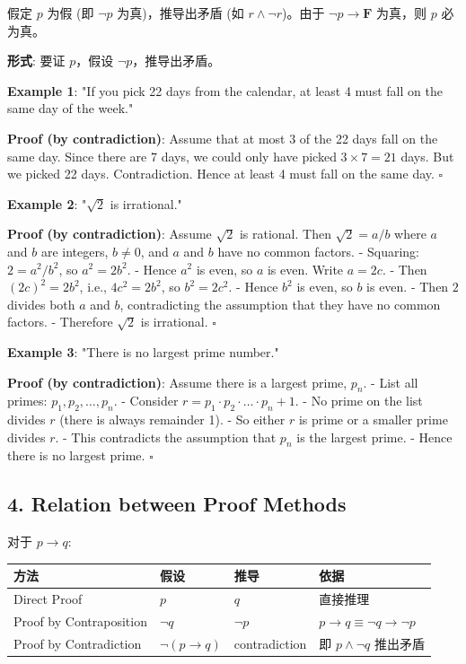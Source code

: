 \documentclass[10pt,a4paper,openany]{ctexbook}
\theoremstyle{definition}
\theoremstyle{remark}
\renewenvironment{quote}
  {\list{}{\leftmargin=1em\rightmargin=0pt\topsep=0.5pt\partopsep=0pt}\item[]}
  {\endlist}
\begin{document}
\begin{quote}
假定 $p$ 为假 (即 $\neg p$ 为真)，推导出矛盾 (如 $r \land \neg r$)。由于 $\neg p \to \mathbf{F}$ 为真，则 $p$ 必为真。

\textbf{形式}: 要证 $p$，假设 $\neg p$，推导出矛盾。

\textbf{Example 1}: "If you pick 22 days from the calendar, at least 4 must fall on the same day of the week."

\textbf{Proof (by contradiction)}: Assume that at most 3 of the 22 days fall on the same day. Since there are 7 days, we could only have picked $3 \times 7 = 21$ days. But we picked 22 days. Contradiction. Hence at least 4 must fall on the same day. $\square$

\textbf{Example 2}: "$\sqrt{2}$ is irrational."

\textbf{Proof (by contradiction)}: Assume $\sqrt{2}$ is rational. Then $\sqrt{2} = a/b$ where $a$ and $b$ are integers, $b \neq 0$, and $a$ and $b$ have no common factors.
- Squaring: $2 = a^2/b^2$, so $a^2 = 2b^2$.
- Hence $a^2$ is even, so $a$ is even. Write $a = 2c$.
- Then $(2c)^2 = 2b^2$, i.e., $4c^2 = 2b^2$, so $b^2 = 2c^2$.
- Hence $b^2$ is even, so $b$ is even.
- Then $2$ divides both $a$ and $b$, contradicting the assumption that they have no common factors.
- Therefore $\sqrt{2}$ is irrational. $\square$

\textbf{Example 3}: "There is no largest prime number."

\textbf{Proof (by contradiction)}: Assume there is a largest prime, $p_n$.
- List all primes: $p_1, p_2, \dots, p_n$.
- Consider $r = p_1 \cdot p_2 \cdot \dots \cdot p_n + 1$.
- No prime on the list divides $r$ (there is always remainder 1).
- So either $r$ is prime or a smaller prime divides $r$.
- This contradicts the assumption that $p_n$ is the largest prime.
- Hence there is no largest prime. $\square$

\end{quote}
\vspace{-2pt}

\subsection{4. Relation between Proof Methods}

对于 $p \to q$:
\begin{center}
\begin{tabular}{llll}
\hline
方法 & 假设 & 推导 & 依据 \\ \hline
Direct Proof & $p$ & $q$ & 直接推理 \\
Proof by Contraposition & $\neg q$ & $\neg p$ & $p \to q \equiv \neg q \to \neg p$ \\
Proof by Contradiction & $\neg(p \to q)$ & contradiction & 即 $p \land \neg q$ 推出矛盾 \\
\hline
\end{tabular}

\end{center}
\end{document}
